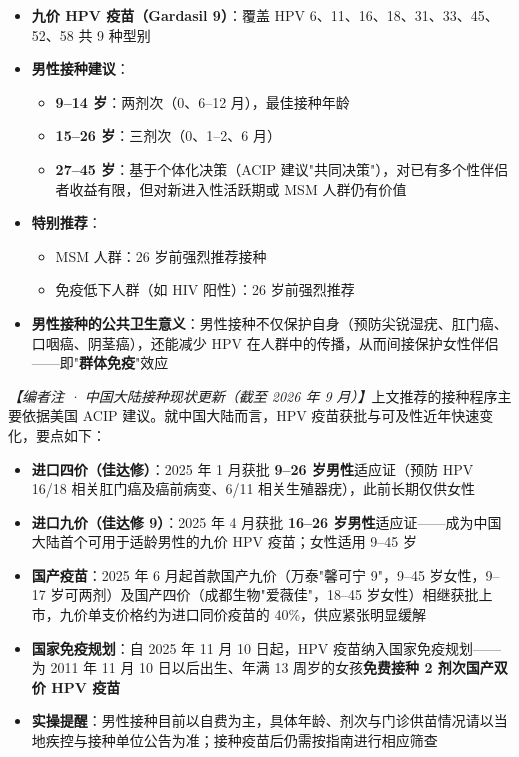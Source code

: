 \documentclass[12pt,a4paper,twoside]{ctexbook}
\begin{document}
\begin{itemize}[leftmargin=2cm]
	\item \textbf{九价 HPV 疫苗（Gardasil 9）}：覆盖 HPV 6、11、16、18、31、33、45、52、58 共 9 种型别
	\item \textbf{男性接种建议}：
	\begin{itemize}
		\item \textbf{9--14 岁}：两剂次（0、6--12 月），最佳接种年龄
		\item \textbf{15--26 岁}：三剂次（0、1--2、6 月）
		\item \textbf{27--45 岁}：基于个体化决策（ACIP 建议"共同决策"），对已有多个性伴侣者收益有限，但对新进入性活跃期或 MSM 人群仍有价值
	\end{itemize}
	\item \textbf{特别推荐}：
	\begin{itemize}
		\item MSM 人群：26 岁前强烈推荐接种
		\item 免疫低下人群（如 HIV 阳性）：26 岁前强烈推荐
	\end{itemize}
	\item \textbf{男性接种的公共卫生意义}：男性接种不仅保护自身（预防尖锐湿疣、肛门癌、口咽癌、阴茎癌），还能减少 HPV 在人群中的传播，从而间接保护女性伴侣——即"\textbf{群体免疫}"效应
\end{itemize}

\noindent\textit{【编者注 · 中国大陆接种现状更新（截至 2026 年 9 月）】}上文推荐的接种程序主要依据美国 ACIP 建议。就中国大陆而言，HPV 疫苗获批与可及性近年快速变化，要点如下：

\begin{itemize}[leftmargin=2cm]
	\item \textbf{进口四价（佳达修）}：2025 年 1 月获批 \textbf{9--26 岁男性}适应证（预防 HPV 16/18 相关肛门癌及癌前病变、6/11 相关生殖器疣），此前长期仅供女性
	\item \textbf{进口九价（佳达修 9）}：2025 年 4 月获批 \textbf{16--26 岁男性}适应证——成为中国大陆首个可用于适龄男性的九价 HPV 疫苗；女性适用 9--45 岁
	\item \textbf{国产疫苗}：2025 年 6 月起首款国产九价（万泰"馨可宁 9"，9--45 岁女性，9--17 岁可两剂）及国产四价（成都生物"爱薇佳"，18--45 岁女性）相继获批上市，九价单支价格约为进口同价疫苗的 40\%，供应紧张明显缓解
	\item \textbf{国家免疫规划}：自 2025 年 11 月 10 日起，HPV 疫苗纳入国家免疫规划——为 2011 年 11 月 10 日以后出生、年满 13 周岁的女孩\textbf{免费接种 2 剂次国产双价 HPV 疫苗}
	\item \textbf{实操提醒}：男性接种目前以自费为主，具体年龄、剂次与门诊供苗情况请以当地疾控与接种单位公告为准；接种疫苗后仍需按指南进行相应筛查
\end{itemize}
\end{document}
